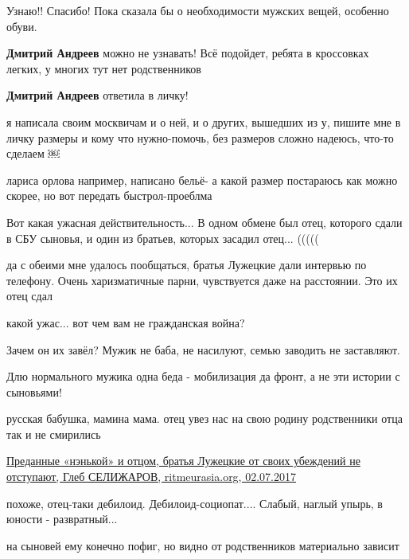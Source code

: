 \begin{itemize}
\begin{itemize} %
Узнаю!! Спасибо! Пока сказала бы о необходимости мужских вещей, особенно обуви.

\textbf{Дмитрий Андреев} можно не узнавать! Всё подойдет, ребята в кроссовках легких, у многих тут нет родственников

\textbf{Дмитрий Андреев} ответила в личку!
\end{itemize} %


я написала своим москвичам и о ней, и о других, вышедших из у, пишите мне в
личку размеры и кому что нужно-помочь, без размеров сложно надеюсь, что-то
сделаем ￼

лариса орлова например, написано бельё- а какой размер постараюсь как можно
скорее, но вот передать быстрол-проеблма


Вот какая ужасная действительность... В одном обмене был отец, которого сдали в
СБУ сыновья, и один из братьев, которых засадил отец... (((((

\begin{itemize} %
да с обеими мне удалось пообщаться, братья Лужецкие дали интервью по телефону. Очень харизматичные парни, чувствуется даже на расстоянии. Это их отец сдал

какой ужас... вот чем вам не гражданская война?

Зачем он их завёл? Мужик не баба, не насилуют, семью заводить не заставляют.

Длю нормального мужика одна беда - мобилизация да фронт, а не эти истории с сыновьями!


русская бабушка, мамина мама.
отец увез нас на свою родину
родственники отца так и не смирились

\href{https://www.ritmeurasia.org/news--2017-07-02--predannye-nenkoj-i-otcom-bratja-luzheckie-ot-svoih-ubezhdenij-ne-otstupajut-31074}{%
Преданные «нэнькой» и отцом, братья Лужецкие от своих убеждений не отступают, Глеб СЕЛИЖАРОВ, ritmeurasia.org, 02.07.2017%
}

похоже, отец-таки дебилоид. Дебилоид-социопат.... Слабый, наглый упырь, в юности - развратный...

на сыновей ему конечно пофиг, но видно от родственников материально зависит


\end{itemize}
\end{itemize}
